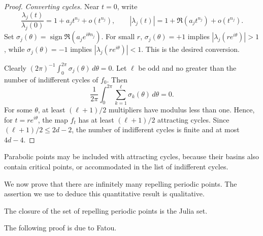 \documentclass[11pt,a4paper]{article}
\begin{document}
\begin{proof}
\emph{Converting cycles.} Near $t=0$, write
\[
\frac{\lambda_j(t)}{\lambda_j(0)}=1+a_jt^{n_j}+o(t^{n_j}),\qquad
|\lambda_j(t)|=1+\Re(a_jt^{n_j})+o(t^{n_j}).
\]
Set $\sigma_j(\theta)=\operatorname{sign}\Re(a_je^{i\theta n_j})$. For small $r$, $\sigma_j(\theta)=+1$ implies $|\lambda_j(re^{i\theta})|>1$, while $\sigma_j(\theta)=-1$ implies $|\lambda_j(re^{i\theta})|<1$. This is the desired conversion.

Clearly $(2\pi)^{-1}\int_0^{2\pi}\sigma_j(\theta)\,d\theta=0$. Let $\ell$ be odd and no greater than the number of indifferent cycles of $f_0$. Then
\[
\frac1{2\pi}\int_0^{2\pi}\sum_{k=1}^{\ell}\sigma_k(\theta)\,d\theta=0.
\]
For some $\theta$, at least $(\ell+1)/2$ multipliers have modulus less than one. Hence, for $t=re^{i\theta}$, the map $f_t$ has at least $(\ell+1)/2$ attracting cycles. Since $(\ell+1)/2\le2d-2$, the number of indifferent cycles is finite and at most $4d-4$.
\end{proof}
\begin{remark}
Parabolic points may be included with attracting cycles, because their basins also contain critical points, or accommodated in the list of indifferent cycles.
\end{remark}
We now prove that there are infinitely many repelling periodic points. The assertion we use to deduce this quantitative result is qualitative.
\setcounter{theorem}{21}\begin{proposition}\label{cd4:density}
The closure of the set of repelling periodic points is the Julia set.
\end{proposition}
The following proof is due to Fatou.
\end{document}
